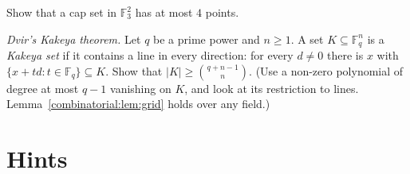 \begin{exercise}[$\star\star$]\label{combinatorial:ex:capplane}
Show that a cap set in $\mathbb F_3^2$ has at most $4$ points.
\end{exercise}

\begin{exercise}[$\star\star\star$]\label{combinatorial:ex:dvir}
\emph{Dvir's Kakeya theorem.} Let $q$ be a prime power and $n\ge1$.
A set $K\subseteq\mathbb F_q^n$ is a \emph{Kakeya set} if it contains a line in every direction: for every $d\ne0$ there is $x$ with $\{x+td:t\in\mathbb F_q\}\subseteq K$. Show that
$|K|\ge\binom{q+n-1}n$. (Use a non-zero polynomial of degree at most $q-1$ vanishing on $K$, and look at its restriction to lines. Lemma~\ref{combinatorial:lem:grid} holds over any field.)
\end{exercise}

\section{Hints}

